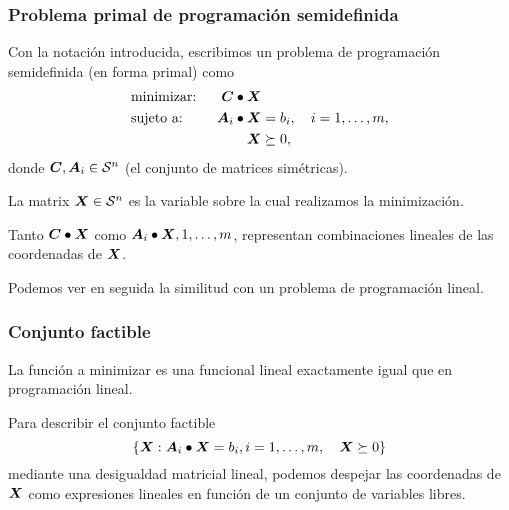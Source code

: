 \documentclass[aspectratio=169,12pt,spanish]{beamer}
\begin{document}
\begin{frame}
\frametitle{Problema primal de programación semidefinida}

Con la notación introducida, escribimos un problema de programación semidefinida (en forma primal) como
\begin{alignat*}{2}
  & \text{minimizar: } & \bm{C} \bullet \bm{X} & \\
  & \text{sujeto a: }  \quad & \bm{A}_i \bullet \bm{X} &= b_i, \quad i = 1, \dots, m, \\
   && \bm{X} &\succeq 0,
\end{alignat*}
donde $\bm{C}, \bm{A}_i \in {\mathcal S}^n$ (el conjunto de matrices simétricas).

La matrix $\bm{X} \in {\mathcal S}^n$ es la variable sobre la cual realizamos la minimización.

Tanto $\bm{C} \bullet \bm{X}$ como $\bm{A}_i \bullet \bm{X}, 1, \dots, m$, representan combinaciones lineales de las coordenadas de $\bm{X}$.

Podemos ver en seguida la similitud con un problema de programación lineal.

\end{frame}


\begin{frame}
\frametitle{Conjunto factible}

La función a minimizar es una funcional lineal exactamente igual que en programación lineal.

Para describir el conjunto factible
$$\{\bm{X} : \bm{A}_i \bullet \bm{X} = b_i, i = 1, \dots, m, \quad \bm{X} \succeq 0\}$$
 mediante una desigualdad matricial lineal, podemos despejar las coordenadas de $\bm{X}$ como expresiones lineales en función de un conjunto de variables libres.


\end{frame}

\end{document}
